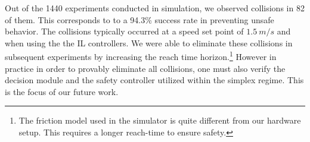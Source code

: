 \documentclass[manuscript,screen,review]{acmart}
\begin{document}



Out of the 1440 experiments conducted in simulation, we observed collisions in 82 of them. This corresponds to to a 94.3\% success rate in preventing unsafe behavior. The collisions typically occurred at a speed set point of $1.5 \ m/s$ and when using the the IL controllers. We were able to eliminate these collisions in subsequent experiments by increasing the reach time horizon.\footnote{The friction model used in the simulator is quite different from our hardware setup. This requires a longer reach-time to ensure safety.} However in practice in order to provably eliminate all collisions, one must also verify the decision module and the safety controller utilized within the simplex regime. This is the focus of our future work.
\end{document}
